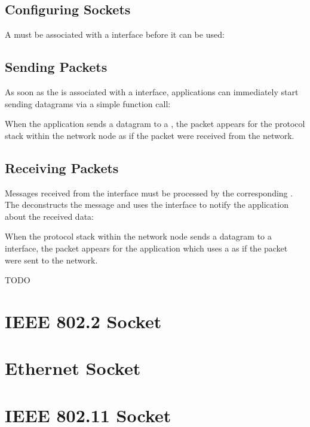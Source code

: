 
\subsection*{Configuring Sockets}

A  must be associated with a  interface before
it can be used:


\subsection*{Sending Packets}

As soon as the  is associated with a 
interface, applications can immediately start sending datagrams via a simple
function call:


When the application sends a datagram to a , the packet
appears for the protocol stack within the network node as if the packet were
received from the network.

\subsection*{Receiving Packets}

Messages received from the  interface must be processed by the
corresponding . The  deconstructs the
message and uses the  interface to notify the
application about the received data:


When the protocol stack within the network node sends a datagram to a
 interface, the packet appears for the application which uses a
 as if the packet were sent to the network.



\ifdraft TODO
\section{IEEE 802.2 Socket}

\section{Ethernet Socket}

\section{IEEE 802.11 Socket}
\fi
